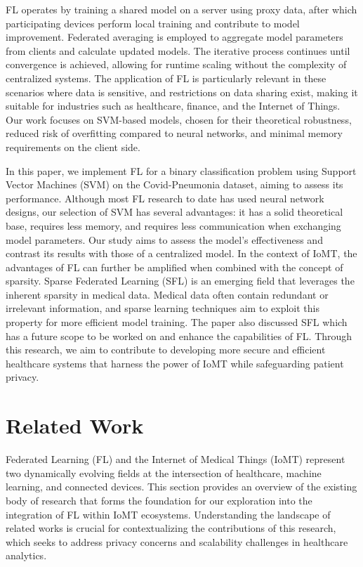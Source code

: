 \documentclass[conference]{IEEEtran}
\begin{document}
FL\cite{3} operates by training a shared model on a server using proxy data, after which participating devices perform local training and contribute to model improvement. Federated averaging is employed to aggregate model parameters from clients and calculate updated models. The iterative process continues until convergence is achieved, allowing for runtime scaling without the complexity of centralized systems. The application of FL\cite{4} is particularly relevant in these scenarios where data is sensitive, and restrictions on data sharing exist, making it suitable for industries such as healthcare, finance, and the Internet of Things. Our work focuses on SVM-based models, chosen for their theoretical robustness, reduced risk\cite{5} of overfitting compared to neural networks, and minimal memory requirements on the client side.

In this paper, we implement FL for a binary classification problem using Support Vector Machines (SVM) on the Covid-Pneumonia dataset, aiming to assess its performance. Although most FL research to date has used neural network designs, our selection of SVM has several advantages: it has a solid theoretical base, requires less memory, and requires less communication when exchanging model parameters. Our study aims to assess the model's effectiveness and contrast its results with those of a centralized model.
In the context of IoMT\cite{6}, the advantages of FL can further be amplified when combined with the concept of sparsity. Sparse Federated Learning (SFL) is an emerging field that leverages the inherent sparsity in medical data. Medical data often contain redundant or irrelevant information, and sparse learning techniques aim to exploit this property for more efficient model training. The paper also discussed SFL which has a future scope to be worked on and enhance the capabilities of FL. Through this research, we aim to contribute to developing more secure and efficient healthcare systems that harness the power of IoMT while safeguarding patient privacy.



\section{Related Work}
Federated Learning (FL) and the Internet of Medical Things (IoMT)\cite{4}  represent two dynamically evolving fields at the intersection of healthcare, machine learning, and connected devices. This section provides an overview of the existing body of research that forms the foundation for our exploration into the integration of FL within IoMT ecosystems. Understanding the landscape of related works is crucial for contextualizing the contributions of this research, which seeks to address privacy concerns and scalability challenges in healthcare analytics.
\end{document}
